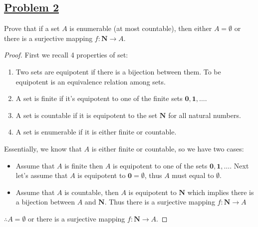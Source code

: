 \documentclass[10pt,letterpaper]{article}
\begin{document}
	\subsection*{{\color{purple}\underline{Problem 2}}}
	Prove that if a set $A$ is enumerable (at most countable), then either $A = \emptyset$ or there is a
	surjective mapping $f: \mathbf{N} \rightarrow A$. 
\begin{proof}
	First we recall 4 properties of set:
	\begin{enumerate}
		\item Two sets are equipotent if there is a bijection between them. To be equipotent
		is an equivalence relation among sets. 
		\item A set is finite if it's equipotent to one of the finite sets $\mathbf{0}, \mathbf{1}, \ldots$.
		\item A set is countable if it is equipotent to the set $\mathbf{N}$ for all natural numbers. 
		\item A set is enumerable if it is either finite or countable.
	\end{enumerate}
	Essentially, we know that $A$ is either finite or countable, so we have two cases:
	\begin{itemize}
		\item Assume that $A$ is finite then $A$ is equipotent to one of the sets $\mathbf{0}, \mathbf{1}, \ldots$.
		Next let's assume that $A$ is equipotent to $\mathbf{0} = \emptyset$, thus $A$ must equal to $\emptyset$.
		\item Assume that $A$ is countable, then $A$ is equipotent to $\mathbf{N}$ which implies there is a bijection between 
		$A$ and $\mathbf{N}$. Thus there is a surjective mapping $f: \mathbf{N} \rightarrow A$
	\end{itemize}
	$\therefore A = \emptyset$ or there is a surjective mapping $f: \mathbf{N} \rightarrow A$.
\end{proof}
	
\end{document}
